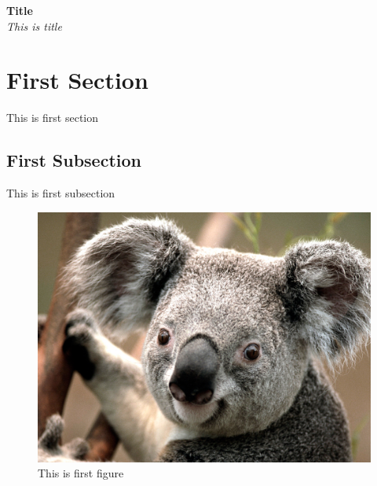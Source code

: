\documentclass{article}
\begin{document}
\begin{titlepage}
\begin{center}
\Large\textbf{Title}\\
\large\textit{This is title}
\end{center}
\end{titlepage}
\section{First Section}
This is first section
\subsection{First Subsection}
This is first subsection
\begin{figure}[h]
	\includegraphics[width=\linewidth]{Koala.jpg}
	\caption{This is first figure}
\end{figure}
\end{document}
